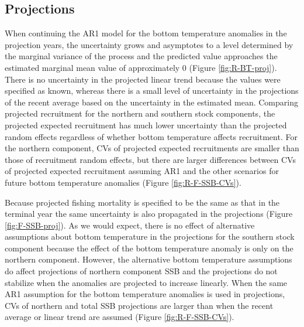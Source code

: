 \documentclass[
]{article}
\begin{document}
\hypertarget{projections-1}{%
\subsection*{Projections}\label{projections-1}}

When continuing the AR1 model for the bottom temperature anomalies in the projection years, the uncertainty grows and asymptotes to a level determined by the marginal variance of the process and the predicted value approaches the estimated marginal mean value of approximately 0 (Figure \ref{fig:R-BT-proj}). There is no uncertainty in the projected linear trend because the values were specified as known, whereas there is a small level of uncertainty in the projections of the recent average based on the uncertainty in the estimated mean. Comparing projected recruitment for the northern and southern stock components, the projected expected recruitment has much lower uncertainty than the projected random effects regardless of whether bottom temperature affects recruitment. For the northern component, CVs of projected expected recruitments are smaller than those of recruitment random effects, but there are larger differences between CVs of projected expected recruitment assuming AR1 and the other scenarios for future bottom temperature anomalies (Figure \ref{fig:R-F-SSB-CVs}).

Because projected fishing mortality is specified to be the same as that in the terminal year the same uncertainty is also propagated in the projections (Figure \ref{fig:F-SSB-proj}). As we would expect, there is no effect of alternative assumptions about bottom temperature in the projections for the southern stock component because the effect of the bottom temperature anomaly is only on the northern component. However, the alternative bottom temperature assumptions do affect projections of northern component SSB and the projections do not stabilize when the anomalies are projected to increase linearly. When the same AR1 assumption for the bottom temperature anomalies is used in projections, CVs of northern and total SSB projections are larger than when the recent average or linear trend are assumed (Figure \ref{fig:R-F-SSB-CVs}).
\end{document}
